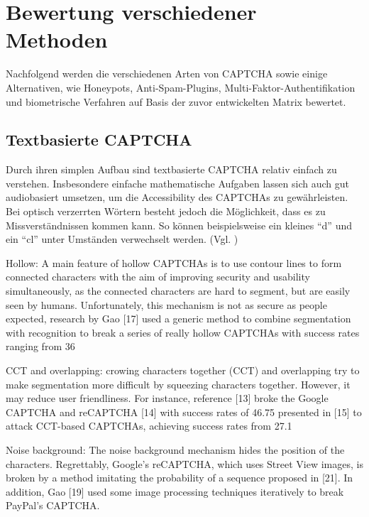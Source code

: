 \chapter{Bewertung verschiedener Methoden}

Nachfolgend werden die verschiedenen Arten von CAPTCHA sowie einige Alternativen, wie Honeypots, Anti-Spam-Plugins, 
Multi-Faktor-Authentifikation und biometrische Verfahren auf Basis der zuvor entwickelten Matrix bewertet. 

\section{Textbasierte CAPTCHA}

Durch ihren simplen Aufbau sind textbasierte CAPTCHA relativ einfach zu verstehen.
Insbesondere einfache mathematische Aufgaben lassen sich auch gut audiobasiert umsetzen, 
um die Accessibility des CAPTCHAs zu gewährleisten.
Bei optisch verzerrten Wörtern besteht jedoch die Möglichkeit, dass es zu Missverständnissen kommen kann.
So können beispielsweise ein kleines ``d'' und ein ``cl'' unter Umständen verwechselt werden. (Vgl. \cite[p.3]{usabilityofcaptchas})

Hollow: A main feature of hollow CAPTCHAs is to use
contour lines to form connected characters with the aim of
improving security and usability simultaneously, as the
connected characters are hard to segment, but are easily seen
by humans. 
Unfortunately, this mechanism is not as secure as
people expected, research by Gao [17] used a generic method
to combine segmentation with recognition to break a series of
really hollow CAPTCHAs with success rates ranging from
36%

CCT and overlapping: crowing characters together
(CCT) and overlapping try to make segmentation more
difficult by squeezing characters together. However, it may
reduce user friendliness. For instance, reference [13] broke the
Google CAPTCHA and reCAPTCHA [14] with success rates
of 46.75%
presented in [15] to attack CCT-based CAPTCHAs, achieving
success rates from 27.1%

Noise background: The noise background mechanism
hides the position of the characters. Regrettably, Google’s
reCAPTCHA, which uses Street View images, is broken by a
method imitating the probability of a sequence proposed in
[21]. In addition, Gao [19] used some image processing
techniques iteratively to break PayPal’s CAPTCHA.

